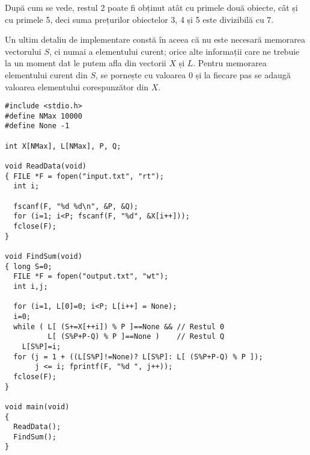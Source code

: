 După cum se vede, restul 2 poate fi obținut atât cu primele două obiecte, cât
și cu primele 5, deci suma prețurilor obiectelor 3, 4 și 5 este divizibilă cu
7.

Un ultim detaliu de implementare constă în aceea că nu este necesară memorarea
vectorului $S$, ci numai a elementului curent; orice alte informații care ne
trebuie la un moment dat le putem afla din vectorii $X$ și $L$. Pentru
memorarea elementului curent din $S$, se pornește cu valoarea 0 și la fiecare
pas se adaugă valoarea elementului corespunzător din $X$.

\begin{verbatim}
#include <stdio.h>
#define NMax 10000
#define None -1

int X[NMax], L[NMax], P, Q;

void ReadData(void)
{ FILE *F = fopen("input.txt", "rt");
  int i;

  fscanf(F, "%d %d\n", &P, &Q);
  for (i=1; i<P; fscanf(F, "%d", &X[i++]));
  fclose(F);
}

void FindSum(void)
{ long S=0;
  FILE *F = fopen("output.txt", "wt");
  int i,j;

  for (i=1, L[0]=0; i<P; L[i++] = None);
  i=0;
  while ( L[ (S+=X[++i]) % P ]==None && // Restul 0
          L[ (S%P+P-Q) % P ]==None )    // Restul Q
    L[S%P]=i;
  for (j = 1 + ((L[S%P]!=None)? L[S%P]: L[ (S%P+P-Q) % P ]);
       j <= i; fprintf(F, "%d ", j++));
  fclose(F);
}

void main(void)
{
  ReadData();
  FindSum();
}
\end{verbatim}
